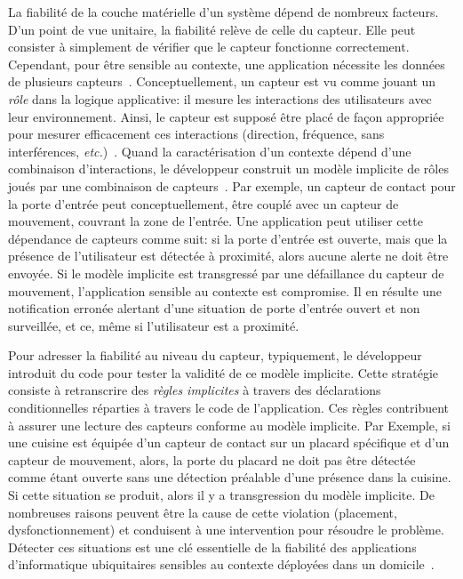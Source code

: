 La fiabilité de la couche matérielle d'un système dépend de nombreux facteurs. D'un point de vue unitaire, la fiabilité relève de celle du capteur. 
Elle peut consister à simplement de vérifier que le capteur fonctionne correctement. Cependant, pour être sensible au contexte, 
une application nécessite les données de plusieurs capteurs~\cite{STANKOVIC-OPPORTUNITIES-COMPUTER2005}. Conceptuellement, un capteur est vu comme jouant un {\em rôle} dans la logique applicative: il mesure les interactions des utilisateurs avec leur environnement. Ainsi, le capteur est supposé être placé de façon appropriée pour mesurer efficacement ces interactions (direction, fréquence, sans interférences, {\em etc.})~\cite{EDWARD-ATHOME-UBICOMP2001}. Quand la caractérisation d'un contexte dépend d'une combinaison d'interactions, le développeur construit un modèle implicite de rôles %
joués par une combinaison de capteurs~\cite{HENRICKSEN-MODELING-PERVASIVE2002}. Par exemple, un capteur de contact pour la porte d'entrée peut conceptuellement, être couplé avec un capteur de mouvement, couvrant la zone de l'entrée. Une application peut utiliser cette dépendance de capteurs comme suit: si la porte d'entrée est ouverte, mais que la présence de l'utilisateur est détectée à proximité, alors aucune alerte ne doit être envoyée. Si le modèle implicite est transgressé par une défaillance du capteur de mouvement, l'application sensible au contexte est compromise. Il en résulte une notification erronée alertant d'une situation de porte d'entrée ouvert et non surveillée, et ce, même si l'utilisateur est a proximité.

Pour adresser la fiabilité au niveau du capteur, typiquement, le développeur introduit du code pour tester la validité de ce modèle implicite. Cette stratégie consiste à retranscrire des {\em règles implicites} à travers des déclarations conditionnelles réparties à travers le code de l'application. Ces règles contribuent à assurer une lecture des capteurs conforme au modèle implicite. Par Exemple, si une cuisine est équipée d'un capteur de contact sur un placard spécifique et d'un capteur de mouvement, alors, la porte du placard ne doit pas être détectée comme étant ouverte sans une détection préalable d'une présence dans la cuisine. Si cette situation se produit, alors il y a transgression du modèle implicite. De nombreuses raisons peuvent être la cause de cette violation (placement, dysfonctionnement) et conduisent à une intervention pour résoudre le problème. Détecter ces situations est une clé essentielle de la fiabilité des applications d'informatique ubiquitaires sensibles au contexte déployées dans un domicile~\cite{BECKMANN-SOME-UBICOMP2004}.
 

